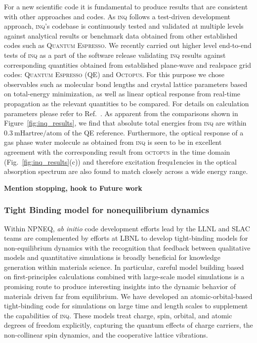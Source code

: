 For a new scientific code it is fundamental to produce results that are consistent with other approaches and codes. 
As \textsc{inq} follows a test-driven development approach, \textsc{inq}'s codebase is continuously tested and validated at multiple levels against analytical results or benchmark data obtained from other established codes such as \textsc{Quantum Espresso}. 
We recently carried out higher level end-to-end tests of \textsc{inq} as a part of the software release validating \textsc{inq} results against corresponding quantities obtained from established plane-wave and realspace grid codes: \textsc{Quantum Espresso} (QE) and \textsc{Octopus}. 
For this purpose we chose observables such as molecular bond lengths and crystal lattice parameters based on total-energy minimization, as well as linear optical response from real-time propagation as the relevant quantities to be compared. 
For details on calculation parameters please refer to Ref.~\cite{Andrade2021}. 
As apparent from the comparisons shown in Figure~\ref{fig:inq_results}, we find that absolute total energies from \textsc{inq} are within \(0.3~\mathrm{mHartree/atom}\) of the QE reference. 
Furthermore, the optical response of a gas phase water molecule as obtained from \textsc{inq} is seen to be in excellent agreement with the corresponding result from \textsc{octopus} in the time domain (Fig.~\ref{fig:inq_results}(c)) and therefore excitation frequ1encies in the optical absorption spectrum are also found to match closely across a wide energy range. 

\textbf{Mention stopping, hook to Future work}

\subsubsection{Tight Binding model for nonequilibrium dynamics}\label{sec:tight-binding}

Within NPNEQ, \emph{ab initio} code development efforts lead by the LLNL and SLAC teams are complemented by efforts at LBNL to develop tight-binding models for non-equilibrium dynamics with the recognition that feedback between qualitative models and quantitative simulations is broadly beneficial for knowledge generation within materials science. 
In particular, careful model building based on first-principles calculations combined with large-scale model simulations is a promising route to produce interesting insights into the dynamic behavior of  materials driven far from equilibrium. 
We have developed an atomic-orbital-based tight-binding code for simulations on large time and length scales to supplement the capabilities of \textsc{inq}. 
These models treat charge, spin, orbital, and atomic degrees of freedom explicitly, capturing the quantum effects of charge carriers, the non-collinear spin dynamics, and the cooperative lattice vibrations. 

